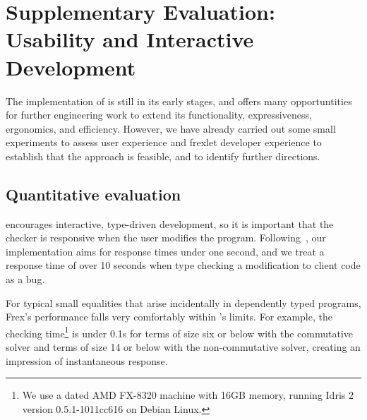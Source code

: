 \section{Supplementary Evaluation: Usability and Interactive Development}

The implementation of \Frexlib{} is still in its early stages, and
offers many opportuntities for further engineering work to extend its
functionality, expressiveness, ergonomics, and efficiency.
%
However, we have already carried out some small experiments to assess
user experience and frexlet developer experience to establish that the
approach is feasible, and to identify further directions.

\subsection{Quantitative evaluation}
\idris{} encourages interactive, type-driven development, so it is
important that the checker is responsive when the user modifies the program.
Following~\citet{nielsen:usability}, our \idris{}
implementation aims for response times under one second, and we treat
a response time of over 10 seconds when type checking a modification
to \Frexlib{} client code as a bug.

\OneVarCommutativeData
{}\OneVarNoncommutativeData
{}\FiveVarCommutativeData
{}\FiveVarNoncommutativeData
{}\TenVarCommutativeData
{}\TenVarNoncommutativeData
{}\FifteenVarCommutativeData
{}\FifteenVarNoncommutativeData

For typical small equalities that arise incidentally in dependently
typed programs, Frex's performance falls very comfortably
within \citeauthor{nielsen:usability}'s limits.  For example, the
checking time\footnote{We use a dated
AMD FX-8320 machine with 16GB memory, running Idris 2 version
0.5.1-1011cc616 on Debian Linux.} is under 0.1s for terms of size six or below with the commutative solver
and terms of size 14 or below with the non-commutative solver, creating an impression of instantaneous response.

